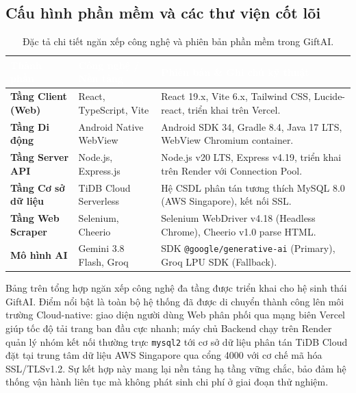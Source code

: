 \subsection{Cấu hình phần mềm và các thư viện cốt lõi}

\begin{table}[htbp]
\centering
\caption{Đặc tả chi tiết ngăn xếp công nghệ và phiên bản phần mềm trong GiftAI.}
\label{tab:env_specs}
\small
\renewcommand{\arraystretch}{1.25}
\begin{tabularx}{\textwidth}{|p{3.2cm}|p{3.6cm}|X|}
\hline
\rowcolor{PrimaryBlue}
\textcolor{white}{\textbf{Thành phần}} & 
\textcolor{white}{\textbf{Công nghệ / Nền tảng}} & 
\textcolor{white}{\textbf{Phiên bản \& Ghi chú kỹ thuật}} \\
\hline
\textbf{Tầng Client (Web)} & React, TypeScript, Vite & React 19.x, Vite 6.x, Tailwind CSS, Lucide-react, triển khai trên Vercel. \\
\hline
\textbf{Tầng Di động} & Android Native WebView & Android SDK 34, Gradle 8.4, Java 17 LTS, WebView Chromium container. \\
\hline
\textbf{Tầng Server API} & Node.js, Express.js & Node.js v20 LTS, Express v4.19, triển khai trên Render với Connection Pool. \\
\hline
\textbf{Tầng Cơ sở dữ liệu} & TiDB Cloud Serverless & Hệ CSDL phân tán tương thích MySQL 8.0 (AWS Singapore), kết nối SSL. \\
\hline
\textbf{Tầng Web Scraper} & Selenium, Cheerio & Selenium WebDriver v4.18 (Headless Chrome), Cheerio v1.0 parse HTML. \\
\hline
\textbf{Mô hình AI} & Gemini 3.8 Flash, Groq & SDK \texttt{@google/generative-ai} (Primary), Groq LPU SDK (Fallback). \\
\hline
\end{tabularx}
\end{table}

Bảng trên tổng hợp ngăn xếp công nghệ đa tầng được triển khai cho hệ sinh thái GiftAI. Điểm nổi bật là toàn bộ hệ thống đã được di chuyển thành công lên môi trường Cloud-native: giao diện người dùng Web phân phối qua mạng biên Vercel giúp tốc độ tải trang ban đầu cực nhanh; máy chủ Backend chạy trên Render quản lý nhóm kết nối thường trực \texttt{mysql2} tới cơ sở dữ liệu phân tán TiDB Cloud đặt tại trung tâm dữ liệu AWS Singapore qua cổng 4000 với cơ chế mã hóa SSL/TLSv1.2. Sự kết hợp này mang lại nền tảng hạ tầng vững chắc, bảo đảm hệ thống vận hành liên tục mà không phát sinh chi phí ở giai đoạn thử nghiệm.


